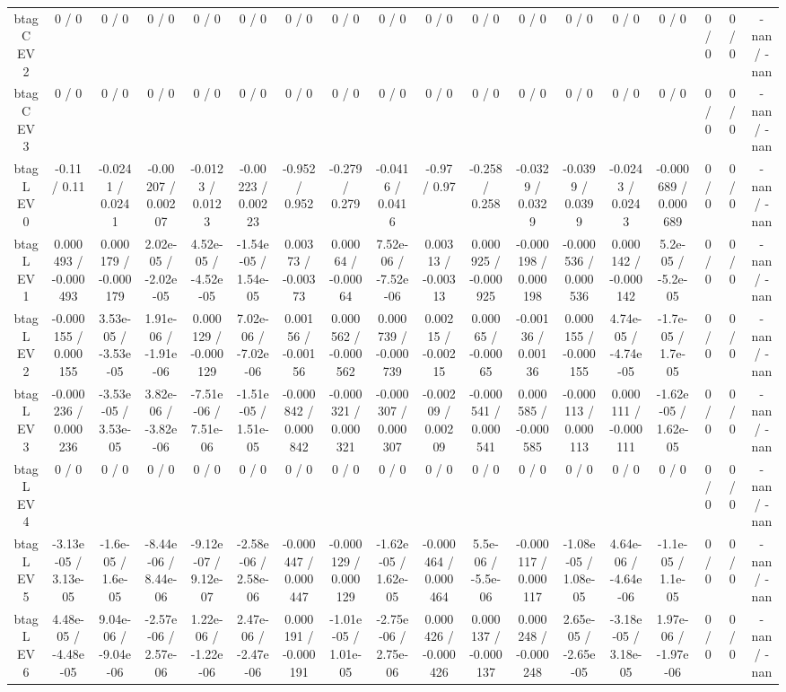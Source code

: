 \documentclass[10pt]{article}
\begin{document}
\begin{table}[htbp]
\begin{center}
\begin{tabular}{|c|c|c|c|c|c|c|c|c|c|c|c|c|c|c|c|c|c|}
  btag C EV 2 & 0 / 0 & 0 / 0 & 0 / 0 & 0 / 0 & 0 / 0 & 0 / 0 & 0 / 0 & 0 / 0 & 0 / 0 & 0 / 0 & 0 / 0 & 0 / 0 & 0 / 0 & 0 / 0 & 0 / 0 & 0 / 0 & -nan / -nan \\ 
  btag C EV 3 & 0 / 0 & 0 / 0 & 0 / 0 & 0 / 0 & 0 / 0 & 0 / 0 & 0 / 0 & 0 / 0 & 0 / 0 & 0 / 0 & 0 / 0 & 0 / 0 & 0 / 0 & 0 / 0 & 0 / 0 & 0 / 0 & -nan / -nan \\ 
  btag L EV 0 & -0.11 / 0.11 & -0.0241 / 0.0241 & -0.00207 / 0.00207 & -0.0123 / 0.0123 & -0.00223 / 0.00223 & -0.952 / 0.952 & -0.279 / 0.279 & -0.0416 / 0.0416 & -0.97 / 0.97 & -0.258 / 0.258 & -0.0329 / 0.0329 & -0.0399 / 0.0399 & -0.0243 / 0.0243 & -0.000689 / 0.000689 & 0 / 0 & 0 / 0 & -nan / -nan \\ 
  btag L EV 1 & 0.000493 / -0.000493 & 0.000179 / -0.000179 & 2.02e-05 / -2.02e-05 & 4.52e-05 / -4.52e-05 & -1.54e-05 / 1.54e-05 & 0.00373 / -0.00373 & 0.00064 / -0.00064 & 7.52e-06 / -7.52e-06 & 0.00313 / -0.00313 & 0.000925 / -0.000925 & -0.000198 / 0.000198 & -0.000536 / 0.000536 & 0.000142 / -0.000142 & 5.2e-05 / -5.2e-05 & 0 / 0 & 0 / 0 & -nan / -nan \\ 
  btag L EV 2 & -0.000155 / 0.000155 & 3.53e-05 / -3.53e-05 & 1.91e-06 / -1.91e-06 & 0.000129 / -0.000129 & 7.02e-06 / -7.02e-06 & 0.00156 / -0.00156 & 0.000562 / -0.000562 & 0.000739 / -0.000739 & 0.00215 / -0.00215 & 0.00065 / -0.00065 & -0.00136 / 0.00136 & 0.000155 / -0.000155 & 4.74e-05 / -4.74e-05 & -1.7e-05 / 1.7e-05 & 0 / 0 & 0 / 0 & -nan / -nan \\ 
  btag L EV 3 & -0.000236 / 0.000236 & -3.53e-05 / 3.53e-05 & 3.82e-06 / -3.82e-06 & -7.51e-06 / 7.51e-06 & -1.51e-05 / 1.51e-05 & -0.000842 / 0.000842 & -0.000321 / 0.000321 & -0.000307 / 0.000307 & -0.00209 / 0.00209 & -0.000541 / 0.000541 & 0.000585 / -0.000585 & -0.000113 / 0.000113 & 0.000111 / -0.000111 & -1.62e-05 / 1.62e-05 & 0 / 0 & 0 / 0 & -nan / -nan \\ 
  btag L EV 4 & 0 / 0 & 0 / 0 & 0 / 0 & 0 / 0 & 0 / 0 & 0 / 0 & 0 / 0 & 0 / 0 & 0 / 0 & 0 / 0 & 0 / 0 & 0 / 0 & 0 / 0 & 0 / 0 & 0 / 0 & 0 / 0 & -nan / -nan \\ 
  btag L EV 5 & -3.13e-05 / 3.13e-05 & -1.6e-05 / 1.6e-05 & -8.44e-06 / 8.44e-06 & -9.12e-07 / 9.12e-07 & -2.58e-06 / 2.58e-06 & -0.000447 / 0.000447 & -0.000129 / 0.000129 & -1.62e-05 / 1.62e-05 & -0.000464 / 0.000464 & 5.5e-06 / -5.5e-06 & -0.000117 / 0.000117 & -1.08e-05 / 1.08e-05 & 4.64e-06 / -4.64e-06 & -1.1e-05 / 1.1e-05 & 0 / 0 & 0 / 0 & -nan / -nan \\ 
  btag L EV 6 & 4.48e-05 / -4.48e-05 & 9.04e-06 / -9.04e-06 & -2.57e-06 / 2.57e-06 & 1.22e-06 / -1.22e-06 & 2.47e-06 / -2.47e-06 & 0.000191 / -0.000191 & -1.01e-05 / 1.01e-05 & -2.75e-06 / 2.75e-06 & 0.000426 / -0.000426 & 0.000137 / -0.000137 & 0.000248 / -0.000248 & 2.65e-05 / -2.65e-05 & -3.18e-05 / 3.18e-05 & 1.97e-06 / -1.97e-06 & 0 / 0 & 0 / 0 & -nan / -nan \\ 

\end{tabular}
\end{center}
\end{table}
\end{document}
